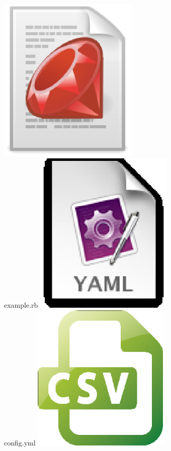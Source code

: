 \documentclass{beamer}
\begin{document}
\begin{frame}[allowframebreaks]
\begin{itemize}
    \begin{columns}
      \begin{column}{3.05cm}
        \hspace*{0.3cm}
        \includegraphics[width=0.5\textwidth]{img/ruby_file.eps} \\
        \hspace*{0.3cm}
        example.rb
        \newline
        \newline
        \hspace*{0.3cm}
        \includegraphics[width=0.5\textwidth]{img/yml_file.eps} \\
        \hspace*{0.3cm}
        config.yml
        \newline
        \newline
        \hspace*{0.3cm}
        \includegraphics[width=0.5\textwidth]{img/csv_file.eps} \\

\end{column}
\end{columns}
\end{itemize}
\end{frame}
\end{document}
